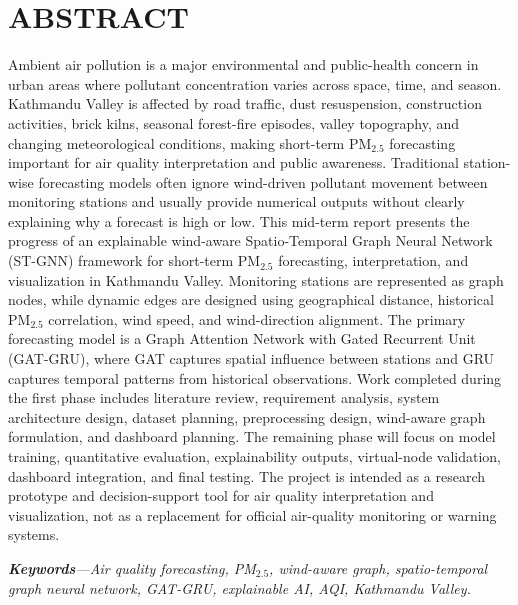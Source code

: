 \chapter*{ABSTRACT}
{}

\bigskip

Ambient air pollution is a major environmental and public-health concern in urban areas where pollutant concentration varies across space, time, and season. Kathmandu Valley is affected by road traffic, dust resuspension, construction activities, brick kilns, seasonal forest-fire episodes, valley topography, and changing meteorological conditions, making short-term PM$_{2.5}$ forecasting important for air quality interpretation and public awareness. Traditional station-wise forecasting models often ignore wind-driven pollutant movement between monitoring stations and usually provide numerical outputs without clearly explaining why a forecast is high or low. This mid-term report presents the progress of an explainable wind-aware Spatio-Temporal Graph Neural Network (ST-GNN) framework for short-term PM$_{2.5}$ forecasting, interpretation, and visualization in Kathmandu Valley. Monitoring stations are represented as graph nodes, while dynamic edges are designed using geographical distance, historical PM$_{2.5}$ correlation, wind speed, and wind-direction alignment. The primary forecasting model is a Graph Attention Network with Gated Recurrent Unit (GAT-GRU), where GAT captures spatial influence between stations and GRU captures temporal patterns from historical observations. Work completed during the first phase includes literature review, requirement analysis, system architecture design, dataset planning, preprocessing design, wind-aware graph formulation, and dashboard planning. The remaining phase will focus on model training, quantitative evaluation, explainability outputs, virtual-node validation, dashboard integration, and final testing. The project is intended as a research prototype and decision-support tool for air quality interpretation and visualization, not as a replacement for official air-quality monitoring or warning systems.

\vspace{1em}
\noindent\textit{\textbf{Keywords}---Air quality forecasting, PM$_{2.5}$, wind-aware graph, spatio-temporal graph neural network, GAT-GRU, explainable AI, AQI, Kathmandu Valley.}
